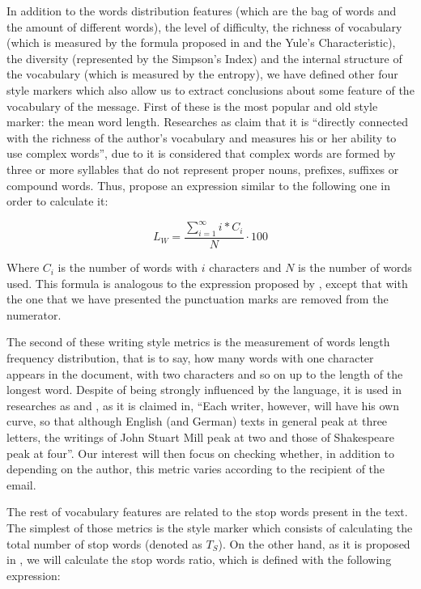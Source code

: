 In addition to the words distribution features (which are the bag of words and the amount of different words), the level of difficulty, the richness of vocabulary (which is measured by the formula proposed in \cite{honore1979some} and the Yule's Characteristic), the diversity (represented by the Simpson's Index) and the internal structure of the vocabulary (which is measured by the entropy), we have defined other four style markers which also allow us to extract conclusions about some feature of the vocabulary of the message. First of these is the most popular and old style marker: the mean word length. Researches as \cite{ril2014determination} claim that it is ``directly connected with the richness of the author's vocabulary and measures his or her ability to use complex words'', due to it is considered that complex words are formed by three or more syllables that do not represent proper nouns, prefixes, suffixes or compound words. Thus, \cite{ril2014determination} propose an expression similar to the following one in order to calculate it:

$$
L_W = \frac{\sum_{i=1}^{\infty}i*C_i}{N}\cdot 100
$$

Where $C_i$ is the number of words with $i$ characters and $N$ is the number of words used. This formula is analogous to the expression proposed by \cite{ril2014determination}, except that with the one that we have presented the punctuation marks are removed from the numerator.

The second of these writing style metrics is the measurement of words length frequency distribution, that is to say, how many words with one character appears in the document, with two characters and so on up to the length of the longest word. Despite of being strongly influenced by the language, it is used in researches as \cite{corney2001identifying} and \cite{kemp1976personal}, as it is claimed in\cite{allen1974methods}, ``Each writer, however, will have his own curve, so that although English (and German) texts in general peak at three letters, the writings of John Stuart Mill peak at two and those of Shakespeare peak at four''. Our interest will then focus on checking whether, in addition to depending on the author, this metric varies according to the recipient of the email.

The rest of vocabulary features are related to the stop words present in the text. The simplest of those metrics is the style marker which consists of calculating the total number of stop words (denoted as $T_S$). On the other hand, as it is proposed in \cite{ril2014determination},  we will calculate the stop words ratio, which is defined with the following expression:

